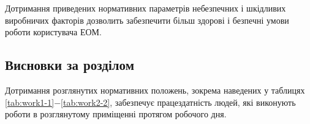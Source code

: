 Дотримання приведених нормативних параметрів небезпечних і шкідливих виробничих факторів дозволить забезпечити більш здорові і безпечні умови роботи користувача ЕОМ.

\vspace{1.5em}

\subsection{Висновки за розділом}

Дотримання розглянутих нормативних положень, зокрема наведених у таблицях \ref{tab:work1-1}$-$\ref{tab:work2-2}, забезпечує працездатність людей, які виконують роботи в розглянутому приміщенні протягом робочого дня.
